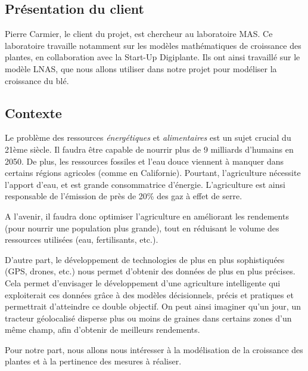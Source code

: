 \subsection{Présentation du client}
Pierre Carmier, le client du projet, est chercheur au laboratoire MAS. Ce laboratoire travaille notamment sur les modèles mathématiques de croissance des plantes, en collaboration avec la Start-Up Digiplante. Ils ont ainsi travaillé sur le modèle LNAS, que nous allons utiliser dans notre projet pour modéliser la croissance du blé.
\subsection{Contexte}
Le problème des ressources \textit{énergétiques} et \textit{alimentaires} est un sujet crucial du  21ème siècle.
Il faudra être capable de nourrir plus de 9 milliards d'humains en 2050. De plus, les ressources fossiles et l'eau douce viennent à manquer dans certains régions agricoles (comme en Californie). Pourtant, l'agriculture nécessite l'apport d'eau, et est grande consommatrice d'énergie. L'agriculture est ainsi responsable de l'émission de près de 20\% des gaz à effet de serre\cite{GES}.

A l'avenir, il faudra donc optimiser l'agriculture en améliorant les rendements (pour nourrir une population plus grande), tout en réduisant le volume des ressources utilisées (eau, fertilisants, etc.).

D'autre part, le développement de technologies de plus en plus sophistiquées (GPS, drones, etc.) nous permet d'obtenir des données de plus en plus précises.
Cela permet d'envisager le développement d'une agriculture intelligente qui exploiterait ces données grâce à des modèles décisionnels, précis et pratiques et permettrait d'atteindre ce double objectif. On peut ainsi imaginer qu'un jour, un tracteur géolocalisé disperse plus ou moins de graines dans certains zones d'un même champ, afin d'obtenir de meilleurs rendements.

Pour notre part, nous allons nous intéresser à la modélisation de la croissance des plantes et à la pertinence des mesures à réaliser.
